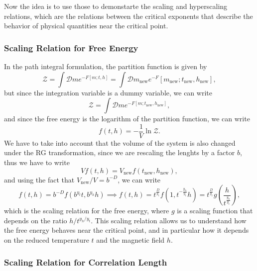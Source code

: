 Now the idea is to use those to demonstarte the scaling and hyperscaling relations, which are the relations between the critical exponents that describe the behavior of physical quantities near the critical point.

\subsubsection{Scaling Relation for Free Energy}

In the path integral formulation, the partition function is given by
\[
    \mathcal{Z} = \int \mathcal{D} m e^{-F[m;t,h]} = \int \mathcal{D} m_{\text{new}} e^{-F}[m_{\text{new}}; t_{\text{new}}, h_{\text{new}}],
\]
but since the integration variable is a dummy variable, we can write
\[
    \mathcal{Z} = \int \mathcal{D} m e^{-F[m; t_{\text{new}}, h_{\text{new}}]},
\]
and since the free energy is the logarithm of the partition function, we can write
\[
    f(t,h) = -\frac{1}{V} \ln \mathcal{Z}.
\]
We have to take into account that the volume of the system is also changed under the RG transformation, since we are rescaling the lenghts by a factor \(b\), thus we have to write
\[
    V f(t,h) = V_{\text{new}} f (t_\text{new}, h_\text{new}),
\]
and using the fact that \(V_{\text{new}} / V = b^{-D}\), we can write
\[
    f(t,h) = b^{-D} f (b^{y_t} t, b^{y_h} h) \implies f(t,h) = t^{\frac{D}{y_t}} f(1, t^{-\tfrac{y_h}{y_t}} h) = t^{\tfrac{D}{y_t}} g\left(\frac{h}{t^{\tfrac{y_h}{y_t}}}\right),
\]
which is the scaling relation for the free energy, where \(g\) is a scaling function that depends on the ratio \(h / t^{y_h / y_t}\). This scaling relation allows us to understand how the free energy behaves near the critical point, and in particular how it depends on the reduced temperature \(t\) and the magnetic field \(h\).

\subsubsection{Scaling Relation for Correlation Length}

